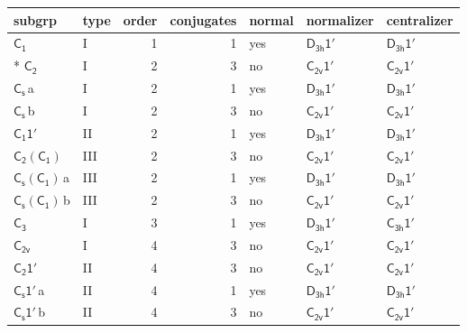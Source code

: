 \documentclass[10pt,a4paper]{article}
\numberwithin{equation}{section}
\newcommand{\grp}[1]{\mathsf{#1}}
\newcommand{\clsletter}[1]{\,{\scriptsize\color{black!55}#1}}
\begin{document}
{\small\begin{longtable}{@{}llrrlll@{}}\toprule
subgrp & type & order & conjugates & normal & normalizer & centralizer\\\midrule\endhead
\bottomrule\endfoot\endlastfoot
\href{../../../rotation/data/pdf/C1.pdf}{$\grp{C_{1}}$} & I & 1 & 1 & yes & \href{D3h-1p.pdf}{$\grp{D_{3h}1'}$} & \href{D3h-1p.pdf}{$\grp{D_{3h}1'}$}\\*
\href{../../../rotation/data/pdf/C2.pdf}{$\grp{C_{2}}$} & I & 2 & 3 & no & \href{C2v-1p.pdf}{$\grp{C_{2v}1'}$} & \href{C2v-1p.pdf}{$\grp{C_{2v}1'}$}\\
\href{../../../rotation/data/pdf/C1v.pdf}{$\grp{C_{s}}$}\clsletter{a} & I & 2 & 1 & yes & \href{D3h-1p.pdf}{$\grp{D_{3h}1'}$} & \href{D3h-1p.pdf}{$\grp{D_{3h}1'}$}\\
\href{../../../rotation/data/pdf/C1v.pdf}{$\grp{C_{s}}$}\clsletter{b} & I & 2 & 3 & no & \href{C2v-1p.pdf}{$\grp{C_{2v}1'}$} & \href{C2v-1p.pdf}{$\grp{C_{2v}1'}$}\\
\href{C1-1p.pdf}{$\grp{C_{1}1'}$} & II & 2 & 1 & yes & \href{D3h-1p.pdf}{$\grp{D_{3h}1'}$} & \href{D3h-1p.pdf}{$\grp{D_{3h}1'}$}\\
\href{C2-C1.pdf}{$\grp{C_{2}}(\grp{C_{1}})$} & III & 2 & 3 & no & \href{C2v-1p.pdf}{$\grp{C_{2v}1'}$} & \href{C2v-1p.pdf}{$\grp{C_{2v}1'}$}\\
\href{C1v-C1.pdf}{$\grp{C_{s}}(\grp{C_{1}})$}\clsletter{a} & III & 2 & 1 & yes & \href{D3h-1p.pdf}{$\grp{D_{3h}1'}$} & \href{D3h-1p.pdf}{$\grp{D_{3h}1'}$}\\
\href{C1v-C1.pdf}{$\grp{C_{s}}(\grp{C_{1}})$}\clsletter{b} & III & 2 & 3 & no & \href{C2v-1p.pdf}{$\grp{C_{2v}1'}$} & \href{C2v-1p.pdf}{$\grp{C_{2v}1'}$}\\
\href{../../../rotation/data/pdf/C3.pdf}{$\grp{C_{3}}$} & I & 3 & 1 & yes & \href{D3h-1p.pdf}{$\grp{D_{3h}1'}$} & \href{C3h-1p.pdf}{$\grp{C_{3h}1'}$}\\
\href{../../../rotation/data/pdf/C2v.pdf}{$\grp{C_{2v}}$} & I & 4 & 3 & no & \href{C2v-1p.pdf}{$\grp{C_{2v}1'}$} & \href{C2v-1p.pdf}{$\grp{C_{2v}1'}$}\\
\href{C2-1p.pdf}{$\grp{C_{2}1'}$} & II & 4 & 3 & no & \href{C2v-1p.pdf}{$\grp{C_{2v}1'}$} & \href{C2v-1p.pdf}{$\grp{C_{2v}1'}$}\\
\href{C1v-1p.pdf}{$\grp{C_{s}1'}$}\clsletter{a} & II & 4 & 1 & yes & \href{D3h-1p.pdf}{$\grp{D_{3h}1'}$} & \href{D3h-1p.pdf}{$\grp{D_{3h}1'}$}\\
\href{C1v-1p.pdf}{$\grp{C_{s}1'}$}\clsletter{b} & II & 4 & 3 & no & \href{C2v-1p.pdf}{$\grp{C_{2v}1'}$} & \href{C2v-1p.pdf}{$\grp{C_{2v}1'}$}\\

\end{longtable}}
\end{document}
